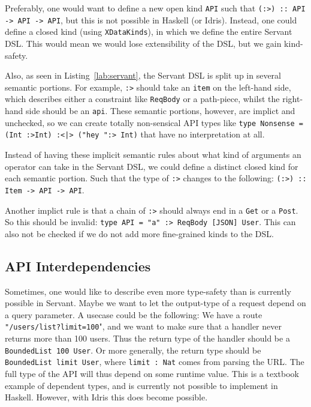 \documentclass[12pt,a4paper]{article}
\begin{document}
Preferably, one would want to define a new open kind \texttt{API} such that \texttt{(:>) :: API -> API -> API}, but this is not possible in Haskell (or Idris). Instead, one could define a closed kind (using \texttt{XDataKinds}), in which we define the entire Servant DSL. This would mean we would lose extensibility of the DSL, but we gain kind-safety.

Also, as seen in Listing~\ref{lab:servant}, the Servant DSL is split up in several semantic portions.  For example, \texttt{:>} should take an \texttt{item} on the left-hand side, which describes either a constraint like \texttt{ReqBody} or a path-piece, whilst the right-hand side should be an \texttt{api}.
These semantic portions, however,  are implict and unchecked, so we can create totally non-sensical API types like \texttt{type Nonsense = (Int :>Int) :<|> ("hey ":> Int)} that have no interpretation at all.

Instead of having these implicit semantic rules about what kind of arguments an operator can take in the Servant DSL, we could define a distinct closed kind for each semantic portion. Such that the type of \texttt{:>} changes to the following: \texttt{(:>) :: Item -> API -> API}.

Another implict rule is that a chain of \texttt{:>} should always end in a \texttt{Get} or a \texttt{Post}. So this should be invalid: \texttt{type API = "a" :> ReqBody [JSON] User}.  This can also not be checked if we do not add more fine-grained kinds to the DSL.

\subsection{API Interdependencies}
\label{sec:inter}
Sometimes, one would like to describe even more type-safety than is currently possible in Servant. Maybe we want to let the output-type of a request depend on a query parameter.
A usecase could be the following: We have a route \texttt{"/users/list?limit=100}", and we want to make sure that a handler never returns more than 100 users.  Thus the return type of the handler should be a \texttt{BoundedList 100 User}. Or more generally, the return type should be \texttt{BoundedList limit User}, where \texttt{limit : Nat} comes from parsing the URL.  The full type of the API will thus depend on some runtime value. This is a textbook example of dependent types, and is currently not possible to implement in Haskell.
However, with Idris this does become possible.
\end{document}
